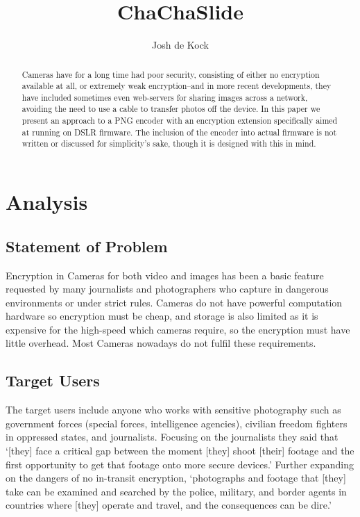 \documentclass{report}
\begin{document}
\title{ChaChaSlide}
\author{Josh de Kock}

\tableofcontents
\clearpage

\renewcommand{\abstractname}{Background}
\begin{abstract}
Cameras have for a long time had poor security, consisting of either no encryption available at all, or extremely weak encryption--and in more recent developments, they have included sometimes even web-servers for sharing images across a network, avoiding the need to use a cable to transfer photos off the device. In this paper we present an approach to a PNG encoder with an encryption extension specifically aimed at running on DSLR firmware. The inclusion of the encoder into actual firmware is not written or discussed for simplicity's sake, though it is designed with this in mind.
\end{abstract}

\chapter{Analysis}

\section{Statement of Problem}

Encryption in Cameras for both video and images has been a basic feature requested by many journalists\cite{freedompress} and photographers who capture in dangerous environments or under strict rules. Cameras do not have powerful computation hardware so encryption must be cheap, and storage is also limited as it is expensive for the high-speed which cameras require, so the encryption must have little overhead. Most Cameras nowadays do not fulfil these requirements.

\section{Target Users}

The target users include anyone who works with sensitive photography such as government forces (special forces, intelligence agencies), civilian freedom fighters in oppressed states, and journalists. Focusing on the journalists they said that `[they] face a critical gap between the moment [they] shoot [their] footage and the first opportunity to get that footage onto more secure devices.' Further expanding on the dangers of no in-transit encryption, `photographs and footage that [they] take can be examined and searched by the police, military, and border agents in countries where [they] operate and travel, and the consequences can be dire.' 
\end{document}
